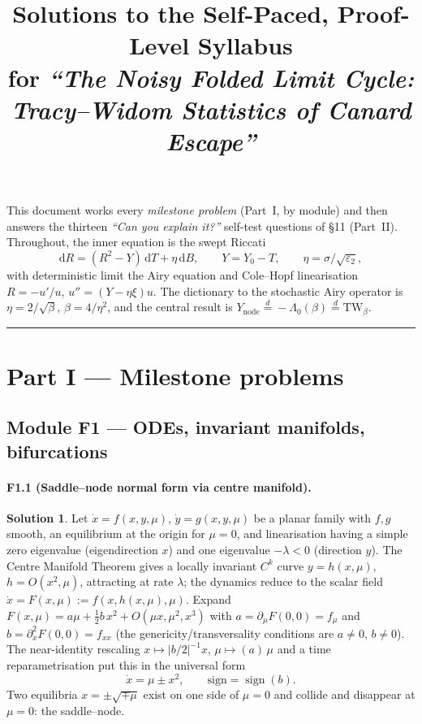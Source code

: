 \documentclass[11pt]{article}
\title{\textbf{Solutions to the Self-Paced, Proof-Level Syllabus}\\[2pt]
\large for \emph{``The Noisy Folded Limit Cycle: Tracy--Widom Statistics of Canard Escape''}}
\author{}
\date{}
\newcommand{\eqd}{\stackrel{d}{=}}
\newcommand{\TW}{\mathrm{TW}}
\newcommand{\ep}{\varepsilon_2}
\newcommand{\dd}{\mathrm{d}}
\newcommand{\Ynode}{Y_{\mathrm{node}}}
\newcommand{\Lam}{\Lambda_0}
\theoremstyle{definition}
\newtheorem*{sol}{Solution}
\begin{document}
\maketitle
\vspace{-2.4em}

\noindent This document works every \emph{milestone problem} (Part~I, by module) and then answers
the thirteen \emph{``Can you explain it?''} self-test questions of \S11 (Part~II). Throughout,
the inner equation is the swept Riccati
\begin{equation}\label{eq:ricc}
\dd R=(R^2-Y)\,\dd T+\eta\,\dd B,\qquad Y=Y_0-T,\qquad \eta=\sigma/\sqrt{\ep},\tag{1}
\end{equation}
with deterministic limit the Airy equation and Cole--Hopf linearisation $R=-u'/u$,
$u''=(Y-\eta\xi)u$. The dictionary to the stochastic Airy operator is $\eta=2/\sqrt\beta$,
$\beta=4/\eta^2$, and the central result is $\Ynode\eqd-\Lam(\beta)\eqd\TW_\beta$.

\bigskip
\hrule
\section*{Part I --- Milestone problems}

\subsection*{Module F1 --- ODEs, invariant manifolds, bifurcations}

\paragraph{F1.1 (Saddle--node normal form via centre manifold).}
\begin{sol}
Let $\dot x=f(x,y,\mu)$, $\dot y=g(x,y,\mu)$ be a planar family with $f,g$ smooth, an
equilibrium at the origin for $\mu=0$, and linearisation having a simple zero eigenvalue
(eigendirection $x$) and one eigenvalue $-\lambda<0$ (direction $y$). The Centre Manifold
Theorem gives a locally invariant $C^k$ curve $y=h(x,\mu)$, $h=O(x^2,\mu)$, attracting at rate
$\lambda$; the dynamics reduce to the scalar field $\dot x=F(x,\mu):=f(x,h(x,\mu),\mu)$.
Expand $F(x,\mu)=a\mu+\tfrac12 b\,x^2+O(\mu x,\mu^2,x^3)$ with
$a=\partial_\mu F(0,0)=f_\mu$ and $b=\partial_x^2F(0,0)=f_{xx}$ (the genericity/transversality
conditions are $a\neq0$, $b\neq0$). The near-identity rescaling
$x\mapsto |b/2|^{-1}x$, $\mu\mapsto (a)\,\mu$ and a time reparametrisation put this in the
universal form
\[
\dot x=\mu\pm x^2,\qquad \text{sign}=\operatorname{sign}(b).
\]
Two equilibria $x=\pm\sqrt{\mp\mu}$ exist on one side of $\mu=0$ and collide and disappear at
$\mu=0$: the saddle--node.
\end{sol}
\end{document}
